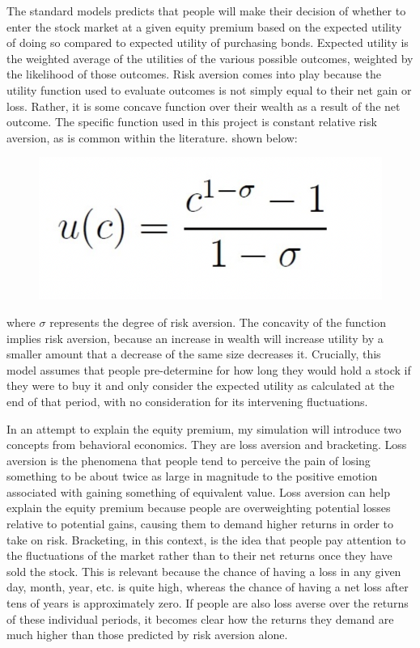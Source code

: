 \documentclass[10pt,twocolumn]{article}
\begin{document}
The standard models predicts that people will make their decision of whether to enter the stock market at a given equity premium based on the expected utility of doing so compared to expected utility of purchasing bonds. Expected utility is the weighted average of the utilities of the various possible outcomes, weighted by the likelihood of those outcomes. Risk aversion comes into play because the utility function used to evaluate outcomes is not simply equal to their net gain or loss. Rather, it is some concave function over their wealth as a result of the net outcome. The specific function used in this project is constant relative risk aversion, as is common within the literature. shown below: 
\begin{figure}[H]
    \centering
    \includegraphics[width=0.5\linewidth]{images/crra.png}
\end{figure}
\noindent where $\sigma$ represents the degree of risk aversion. The concavity of the function implies risk aversion, because an increase in wealth will increase utility by a smaller amount that a decrease of the same size decreases it. Crucially, this model assumes that people pre-determine for how long they would hold a stock if they were to buy it and only consider the expected utility as calculated at the end of that period, with no consideration for its intervening fluctuations. 

In an attempt to explain the equity premium, my simulation will introduce two concepts from behavioral economics. They are loss aversion and bracketing. Loss aversion is the phenomena that people tend to perceive the pain of losing something to be about twice as large in magnitude to the positive emotion associated with gaining something of equivalent value. Loss aversion can help explain the equity premium because people are overweighting potential losses relative to potential gains, causing them to demand higher returns in order to take on risk. Bracketing, in this context, is the idea that people pay attention to the fluctuations of the market rather than to their net returns once they have sold the stock. This is relevant because the chance of having a loss in any given day, month, year, etc. is quite high, whereas the chance of having a net loss after tens of years is approximately zero. If people are also loss averse over the returns of these individual periods, it becomes clear how the returns they demand are much higher than those predicted by risk aversion alone.
\end{document}
